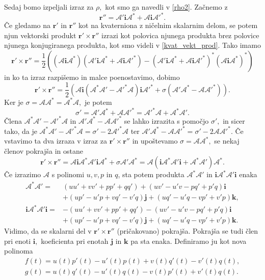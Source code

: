 \documentclass[12pt,a4paper,twoside]{article}
\theoremstyle{definition} %
\theoremstyle{plain} %
\theoremstyle{primerstyle}
\numberwithin{equation}{section}  %
\newcommand{\rV}{\mathbf{r}}
\newcommand{\iV}{\mathbf{i}}
\newcommand{\jV}{\mathbf{j}}
\newcommand{\kV}{\mathbf{k}}
\newcommand{\AQ}{\mathcal{A}}
\begin{document}
Sedaj bomo izpeljali izraz za $\rho,$ kot smo ga navedli v \eqref{rho2}. Začnemo z $$\rV''=\AQ'\iV\AQ^*+\AQ\iV\AQ'^*.$$ Če gledamo na $\rV'$ in $\rV''$ kot na kvaterniona z ničelnim skalarnim delom, se potem njun vektorski produkt $\rV'\times\rV''$ izrazi kot polovica njunega produkta brez polovice njunega konjugiranega produkta, kot smo videli v \eqref{kvat_vekt_prod}. Tako imamo
\begin{equation*}
	\rV'\times\rV''=\frac{1}{2}\left ( (\AQ\iV\AQ^*)(\AQ'\iV\AQ^*+\AQ\iV\AQ'^*)-(\AQ'\iV\AQ^*+\AQ\iV\AQ'^*)^*(\AQ\iV\AQ^*)^* \right )
\end{equation*}
in ko ta izraz razpišemo in malce poenostavimo, dobimo
\begin{equation*}
	\rV'\times\rV''=\frac{1}{2}\left ( \AQ\iV(\AQ^*\AQ'-\AQ'^*\AQ)\iV\AQ'^*+\sigma(\AQ'\AQ^*-\AQ\AQ'^*) \right ).
\end{equation*}
Ker je $\sigma=\AQ\AQ^*=\AQ^*\AQ,$ je potem
\begin{equation*}
	\sigma'=\AQ'\AQ^*+\AQ\AQ'^*=\AQ'^*\AQ+\AQ^*\AQ'.
\end{equation*}
Člena $\AQ^*\AQ'-\AQ'^*\AQ$ in $\AQ'\AQ^*-\AQ\AQ'^*$ se lahko izrazita s pomočjo $\sigma',$ in sicer tako, da je $\AQ^*\AQ'-\AQ'^*\AQ=\sigma'-2\AQ'^*\AQ$ ter $\AQ'\AQ^*-\AQ\AQ'^*=\sigma'-2\AQ\AQ'^*.$ Če vstavimo ta dva izraza v izraz za $\rV'\times\rV''$ in upoštevamo $\sigma=\AQ\AQ^*,$ se nekaj členov pokrajša in ostane
\begin{equation*}
	\rV'\times\rV''=\AQ\iV\AQ^*\AQ'\iV\AQ^* + \sigma\AQ'\AQ^*=\AQ(\iV\AQ^*\AQ'\iV + \AQ^*\AQ')\AQ^*.
\end{equation*}
Če izrazimo $\AQ$ s polinomi $u,v,p$ in $q$, sta potem produkta $\AQ^*\AQ'$ in $\iV\AQ^*\AQ'\iV$ enaka
\begin{align*}
	\AQ^*\AQ'=&(uu'+vv'+pp'+qq')+(uv'-u'v-pq'+p'q)\iV \\
	&+(up'-u'p+vq'-v'q)\jV+(uq'-u'q-vp'+v'p)\kV, \\
	\iV\AQ^*\AQ'\iV=&-(uu'+vv'+pp'+qq')-(uv'-u'v-pq'+p'q)\iV \\
	&+(up'-u'p+vq'-v'q)\jV+(uq'-u'q-vp'+v'p)\kV.
\end{align*}
Vidimo, da se skalarni del v $\rV'\times\rV''$ (pričakovano) pokrajša. Pokrajša se tudi člen pri enoti $\iV,$ koeficienta pri enotah $\jV$ in $\kV$ pa sta enaka. Definiramo ju kot nova polinoma
\begin{align}
	f(t)=u(t)p'(t)-u'(t)p(t)+v(t)q'(t)-v'(t)q(t), \nonumber \\
	g(t)=u(t)q'(t)-u'(t)q(t)-v(t)p'(t)+v'(t)q(t). \label{polinoma_f_g}
\end{align}
\end{document}

